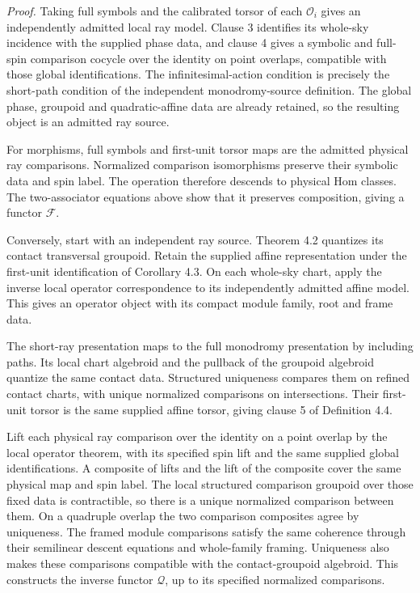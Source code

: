 \documentclass[
  english,
  11pt,
  reqno]{amsart}
\begin{document}
\emph{Proof.} Taking full symbols and the calibrated torsor of each
\(\mathcal O_i\) gives an independently admitted local ray model. Clause
3 identifies its whole-sky incidence with the supplied phase data, and
clause 4 gives a symbolic and full-spin comparison cocycle over the
identity on point overlaps, compatible with those global
identifications. The infinitesimal-action condition is precisely the
short-path condition of the independent monodromy-source definition. The
global phase, groupoid and quadratic-affine data are already retained,
so the resulting object is an admitted ray source.

For morphisms, full symbols and first-unit torsor maps are the admitted
physical ray comparisons. Normalized comparison isomorphisms preserve
their symbolic data and spin label. The operation therefore descends to
physical Hom classes. The two-associator equations above show that it
preserves composition, giving a functor \(\mathcal F\).

Conversely, start with an independent ray source. Theorem 4.2 quantizes
its contact transversal groupoid. Retain the supplied affine
representation under the first-unit identification of Corollary 4.3. On
each whole-sky chart, apply the inverse local operator correspondence to
its independently admitted affine model. This gives an operator object
with its compact module family, root and frame data.

The short-ray presentation maps to the full monodromy presentation by
including paths. Its local chart algebroid and the pullback of the
groupoid algebroid quantize the same contact data. Structured uniqueness
compares them on refined contact charts, with unique normalized
comparisons on intersections. Their first-unit torsor is the same
supplied affine torsor, giving clause 5 of Definition 4.4.

Lift each physical ray comparison over the identity on a point overlap
by the local operator theorem, with its specified spin lift and the same
supplied global identifications. A composite of lifts and the lift of
the composite cover the same physical map and spin label. The local
structured comparison groupoid over those fixed data is contractible, so
there is a unique normalized comparison between them. On a quadruple
overlap the two comparison composites agree by uniqueness. The framed
module comparisons satisfy the same coherence through their semilinear
descent equations and whole-family framing. Uniqueness also makes these
comparisons compatible with the contact-groupoid algebroid. This
constructs the inverse functor \(\mathcal Q\), up to its specified
normalized comparisons.
\end{document}
